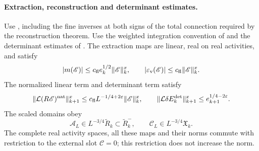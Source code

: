 \paragraph{Extraction, reconstruction and determinant estimates.}
Use \cite[Theorems A--B and Appendix B]{NormalizedContraction},
including the fine inverses at both signs of the total connection
required by the reconstruction theorem.
Use the weighted integration convention of
\cite[Theorem B and Proposition 5.1]{FermionBlockManuscript}
and the determinant estimates of
\cite[Propositions 6.1--6.2]{FermionBlockManuscript}.
The extraction maps are linear, real on real activities, and satisfy
\[
 |m(\mathscr E)|\le c_{\rm fl}e_k^{1/2}\|\mathscr E\|_k^x,\qquad
 |\varepsilon_{\rm v}(\mathscr E)|\le c_{\rm fl}\|\mathscr E\|_k^x .
\]
The normalized linear term and determinant term satisfy
\[
 \|\mathcal L(R\mathscr E)^{\rm nat}\|_{k+1}^x
      \le c_{\rm fl}L^{-1/4+2\varepsilon}\|\mathscr E\|_k^x,
 \qquad
 \|\mathcal L\delta E_k^{\rm det}\|_{k+1}^x
      \le e_{k+1}^{1/4-2\varepsilon}.
\]
The scaled domains obey
\[
 \mathscr A_L\in L^{-3/4}\widetilde R_k\subset\widetilde R_k^-,
 \qquad \mathscr C_L\in L^{-3/4}\mathfrak X_k.
\]
The complete real activity spaces, all these maps and their norms
commute with restriction to the external slot \(\mathscr C=0\);
this restriction does not increase the norm.

